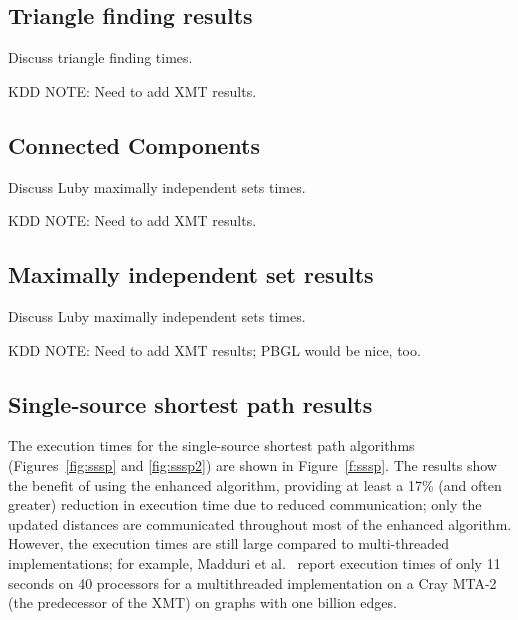 \subsection{Triangle finding results}
Discuss triangle finding times.

KDD NOTE:  Need to add XMT results.

\subsection{Connected Components}
Discuss Luby maximally independent sets times.

KDD NOTE:  Need to add XMT results.

\subsection{Maximally independent set results}
Discuss Luby maximally independent sets times.

KDD NOTE:  Need to add XMT results; PBGL would be nice, too.

\subsection{Single-source shortest path results}

The execution times for the single-source shortest path algorithms
(Figures~\ref{fig:sssp} and \ref{fig:sssp2})
are shown in Figure~\ref{f:sssp}.  The results show the benefit of
using the enhanced algorithm, providing at least a 17\% (and often greater)
reduction in execution time due to reduced communication; only the updated
distances are communicated throughout most of the enhanced algorithm.
However, the execution times are still large compared to multi-threaded
implementations; for example, Madduri et al.~\cite{Madduri07} report
execution times of only 11 seconds on 40 
processors for a multithreaded implementation on a Cray MTA-2
(the predecessor of the XMT) on graphs with one billion edges.

